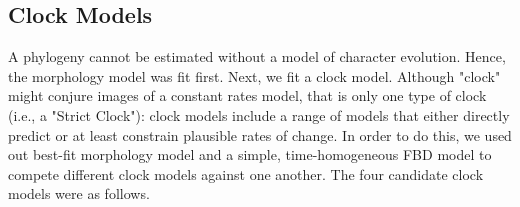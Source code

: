 \documentclass{article}
\begin{document}
\subsection{Clock Models}

A phylogeny cannot be estimated without a model of character evolution. %
Hence, the morphology model was fit first.
Next, we fit a clock model.
Although "clock" might conjure images of a constant rates model, that is only one type of clock (i.e., a "Strict Clock"): clock models include a range of models that either directly predict or at least constrain plausible rates of change. %
In order to do this, we used out best-fit morphology model and a simple, time-homogeneous FBD model to compete different clock models against one another.
The four candidate clock models were as follows.
\end{document}
